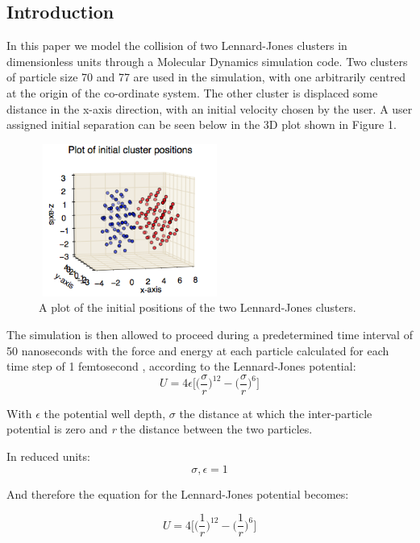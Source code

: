 \documentclass{article}
\begin{document}
\begin{multicols}{2}
\part{Introduction}
In this paper we model the collision of two Lennard-Jones clusters in dimensionless units through a Molecular Dynamics simulation code. Two clusters of particle size 70 and 77 \cite{doye} are used in the simulation, with one arbitrarily centred at the origin of the co-ordinate system. The other cluster is displaced some distance in the x-axis direction, with an initial velocity chosen by the user. A user assigned initial separation can be seen below in the 3D plot shown in Figure 1.
\begin{figure}[H]
\center
\includegraphics[height=5cm,width=6cm]{init_cluster_pos}
\captionsetup{font=footnotesize, justification=centering,singlelinecheck=false}
\caption{A plot of the initial positions of the two Lennard-Jones clusters.}	
\end{figure}


 The simulation is then allowed to proceed during a predetermined time interval of 50 nanoseconds with the force and energy at each particle calculated for each time step of 1 femtosecond \cite{time-step}, according to the Lennard-Jones potential: 
 \[U = 4 \epsilon \Big[ \Big(\frac{\sigma}r\Big)^{12} - \Big(\frac{\sigma}r \Big)^6 \Big]\]

\begin{flushleft}
 With $\epsilon$ the potential well depth, $\sigma$ the distance at which the inter-particle potential is zero and \textit{r} the distance between the two particles.
 \end{flushleft}
 
 In reduced units: \[\sigma,\epsilon=1\]
 
 And therefore the equation for the Lennard-Jones potential becomes:
 
 \[U = 4\Big[ \Big(\frac{1}r\Big)^{12} - \Big(\frac{1}r \Big)^6 \Big]\]
 

\end{multicols}
\end{document}
